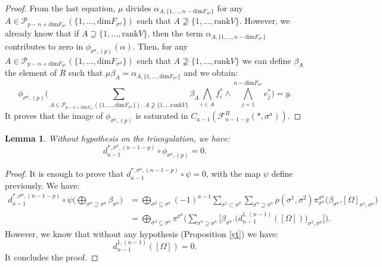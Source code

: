 \documentclass{article}
\newtheorem{lemma}{Lemma}
\begin{document}
\begin{proof}
    From the last equation, $\mu$ divides $\alpha_{A,\{1,...,n-\mathrm{dim}F_{\sigma^a}\}}$ for any $A \in \mathcal{P}_{p-n+\mathrm{dim} F_{\sigma^a}}(\{1,...,\mathrm{dim}F_{\sigma^a}\})$ such that $A \not\supseteq\{1,...,\mathrm{rank}V\}$. However, we already know that if $A \supseteq\{1,...,\mathrm{rank}V\}$, then the term $\alpha_{A,\{1,...,n-\mathrm{dim}F_{\sigma^a}\}}$ contributes to zero in $\phi_{\sigma^{a},(p)}(\alpha)$. Then, for any $A \in \mathcal{P}_{p-n+\mathrm{dim} F_{\sigma^a}}(\{1,...,\mathrm{dim}F_{\sigma^a}\})$ such that $A \not\supseteq\{1,...,\mathrm{rank}V\}$ we can define $\beta_A$ the element of $R$ such that $\mu\beta_A = \alpha_{A,\{1,...,\mathrm{dim}F_{\sigma^a}\}}$ and we obtain:
    \begin{equation*}
        \phi_{\sigma^{a},(p)}\Bigg( \sum_{A \in \mathcal{P}_{p-n+\mathrm{dim} F_{\sigma^a}}(\{1,...,\mathrm{dim}F_{\sigma^a}\}), ~A\not\supseteq\{1,...\mathrm{rank}V\}}\beta_A\bigwedge_{i\in A}f_i^*\wedge \bigwedge_{j=1}^{n-\mathrm{dim}F_{\sigma^a}}e_j^* \Bigg) = y.
    \end{equation*}
    It proves that the image of $\phi_{\sigma^{a},(p)}$ is saturated in $C_{a-1}(\mathcal{F}_{n-1-p}^R(*,\sigma^a))$.
\end{proof}

\begin{lemma}
    Without hypothesis on the triangulation, we have:
    \begin{equation*}
        d^{*,\sigma^a,(n-1-p)}_{a-1} \circ \phi_{\sigma^a,(p)} = 0.
    \end{equation*}
\end{lemma}

\begin{proof}
    It is enough to prove that $d^{*,\sigma^a,(n-1-p)}_{a-1} \circ \psi =0$, with the map $\psi$ define previously. We have:
    \begin{align*}
        d^{*,\sigma^a,(n-1-p)}_{a-1} \circ \psi\Bigg( \bigoplus_{\sigma^n \supseteq \sigma^a}\beta_{\sigma^n}\Bigg) &= \bigoplus_{\sigma^2 \subseteq \sigma^a} (-1)^{a-1} \sum_{\sigma^1 \subset \sigma^2} \sum_{\sigma^n \supseteq \sigma^a}\rho(\sigma^1,\sigma^2)\pi^{\sigma^a}_{\sigma^n}\Bigg(\beta_{\sigma^n}.[\Omega]_{\sigma^1,\sigma^n} \Bigg) \\
        & =\bigoplus_{\sigma^2 \subseteq \sigma^a} \pi^{\sigma^a} \Bigg( \sum_{\sigma^n \supseteq \sigma^a} \Bigg[ \beta_{\sigma^n} . \Bigg( d^{1,(n-1)}_{n-1}([\Omega]) \Bigg)_{\sigma^2,\sigma^n} \Bigg]\Bigg).
    \end{align*}
    However, we know that without any hypothesis (Proposition \ref{yt}) we have:
    \begin{equation*}
        d^{1,(n-1)}_{n-1}([\Omega]) = 0.
    \end{equation*}
    It concludes the proof.
\end{proof}
\end{document}
